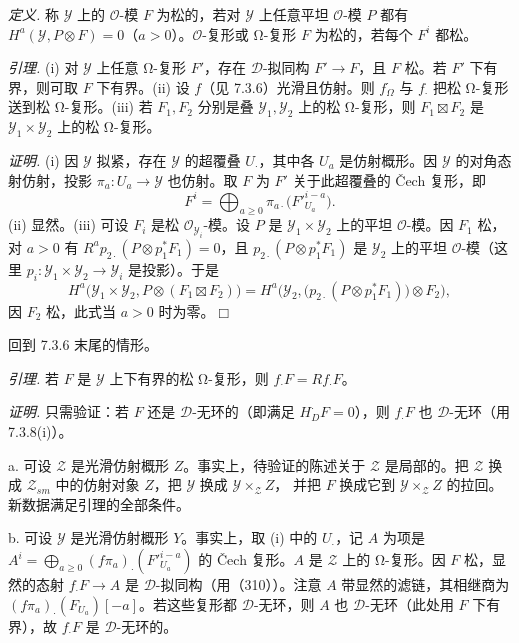 
 \emph{定义.} 称 $\mathcal{Y}$ 上的 $\mathcal{O}$-模 $F$ 为松的，若对 $\mathcal{Y}$ 上任意平坦 $\mathcal{O}$-模 $P$ 都有 $H^{a}(\mathcal{Y},P\otimes F)=0$（$a>0$）。$\mathcal{O}$-复形或 Ω-复形 $F$ 为松的，若每个 $F^{i}$ 都松。

 \emph{引理.} (i) 对 $\mathcal{Y}$ 上任意 Ω-复形 $F'$，存在 $\mathcal{D}$-拟同构 $F'\to F$，且 $F$ 松。若 $F'$ 下有界，则可取 $F$ 下有界。(ii) 设 $f$（见 7.3.6）光滑且仿射。则 $f_{\Omega}^{\cdot}$ 与 $f_{\cdot}$ 把松 Ω-复形送到松 Ω-复形。(iii) 若 $F_{1},F_{2}$ 分别是叠 $\mathcal{Y}_{1},\mathcal{Y}_{2}$ 上的松 Ω-复形，则 $F_{1}\boxtimes F_{2}$ 是 $\mathcal{Y}_{1}\times\mathcal{Y}_{2}$ 上的松 Ω-复形。

\emph{证明.} (i) 因 $\mathcal{Y}$ 拟紧，存在 $\mathcal{Y}$ 的超覆叠 $U_{\cdot}$，其中各 $U_{a}$ 是仿射概形。因 $\mathcal{Y}$ 的对角态射仿射，投影 $\pi_{a}:U_{a}\to\mathcal{Y}$ 也仿射。取 $F$ 为 $F'$ 关于此超覆叠的 Čech 复形，即
\[
F^{i}=\bigoplus_{a\ge0}\pi_{a\cdot}\bigl(F'^{i-a}_{U_{a}}\bigr).
\]
(ii) 显然。(iii) 可设 $F_{i}$ 是松 $\mathcal{O}_{\mathcal{Y}_{i}}$-模。设 $P$ 是 $\mathcal{Y}_{1}\times\mathcal{Y}_{2}$ 上的平坦 $\mathcal{O}$-模。因 $F_{1}$ 松，对 $a>0$ 有 $R^{a}p_{2\cdot}(P\otimes p_{1}^{*}F_{1})=0$，且 $p_{2\cdot}(P\otimes p_{1}^{*}F_{1})$ 是 $\mathcal{Y}_{2}$ 上的平坦 $\mathcal{O}$-模（这里 $p_{i}:\mathcal{Y}_{1}\times\mathcal{Y}_{2}\to\mathcal{Y}_{i}$ 是投影）。于是
\[
H^{a}\bigl(\mathcal{Y}_{1}\times\mathcal{Y}_{2},P\otimes(F_{1}\boxtimes F_{2})\bigr)
=H^{a}\bigl(\mathcal{Y}_{2},\bigl(p_{2\cdot}(P\otimes p_{1}^{*}F_{1})\bigr)\otimes F_{2}\bigr),
\]
因 $F_{2}$ 松，此式当 $a>0$ 时为零。\hfill$\Box$

回到 7.3.6 末尾的情形。

 \emph{引理.} 若 $F$ 是 $\mathcal{Y}$ 上下有界的松 Ω-复形，则 $f_{\cdot}F=Rf_{\cdot}F$。

\emph{证明.} 只需验证：若 $F$ 还是 $\mathcal{D}$-无环的（即满足 $H^{\cdot}_{D}F=0$），则 $f_{\cdot}F$ 也 $\mathcal{D}$-无环（用 7.3.8(i)）。

a. 可设 $\mathcal{Z}$ 是光滑仿射概形 $Z$。事实上，待验证的陈述关于 $\mathcal{Z}$ 是局部的。把 $\mathcal{Z}$ 换成 $\mathcal{Z}_{sm}$ 中的仿射对象 $Z$，把 $\mathcal{Y}$ 换成 $\mathcal{Y}\times_{\mathcal{Z}}Z$，
%
并把 $F$ 换成它到 $\mathcal{Y}\times_{\mathcal{Z}}Z$ 的拉回。新数据满足引理的全部条件。

b. 可设 $\mathcal{Y}$ 是光滑仿射概形 $Y$。事实上，取 (i) 中的 $U_{\cdot}$，记 $A$ 为项是 $A^{i}=\bigoplus_{a\ge0}(f\pi_{a})_{\cdot}(F'^{i-a}_{U_{a}})$ 的 Čech 复形。$A$ 是 $\mathcal{Z}$ 上的 Ω-复形。因 $F$ 松，显然的态射 $f_{\cdot}F\to A$ 是 $\mathcal{D}$-拟同构（用（310））。注意 $A$ 带显然的滤链，其相继商为 $(f\pi_{a})_{\cdot}(F_{U_{a}})[-a]$。若这些复形都 $\mathcal{D}$-无环，则 $A$ 也 $\mathcal{D}$-无环（此处用 $F$ 下有界），故 $f_{\cdot}F$ 是 $\mathcal{D}$-无环的。


